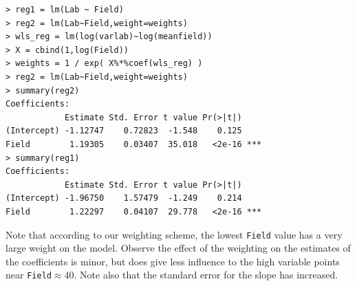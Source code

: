 \documentclass{homework}
\begin{document}
\begin{longproblem}
\begin{solution}
\begin{minipage}{.5\textwidth}
{\small
\begin{verbatim}
> reg1 = lm(Lab ~ Field)
> reg2 = lm(Lab~Field,weight=weights) 
> wls_reg = lm(log(varlab)~log(meanfield))
> X = cbind(1,log(Field))
> weights = 1 / exp( X%*%coef(wls_reg) )
> reg2 = lm(Lab~Field,weight=weights)
> summary(reg2) 
Coefficients:
            Estimate Std. Error t value Pr(>|t|)    
(Intercept) -1.12747    0.72823  -1.548    0.125    
Field        1.19305    0.03407  35.018   <2e-16 ***
> summary(reg1)
Coefficients:
            Estimate Std. Error t value Pr(>|t|)    
(Intercept) -1.96750    1.57479  -1.249    0.214    
Field        1.22297    0.04107  29.778   <2e-16 ***
\end{verbatim}
}
\end{minipage}
\begin{minipage}{.5\textwidth}
\vspace{-2cm}
Note that according to our weighting scheme, the lowest \texttt{Field} value
has a very large weight on the model.  Observe the effect of the weighting on the
estimates of the coefficients is minor, but does give less influence to the  high variable points
near \texttt{Field}$\approx 40$.  Note also that the standard error for the slope has increased.
\end{minipage}
\end{solution}



\end{longproblem}
\end{document}
